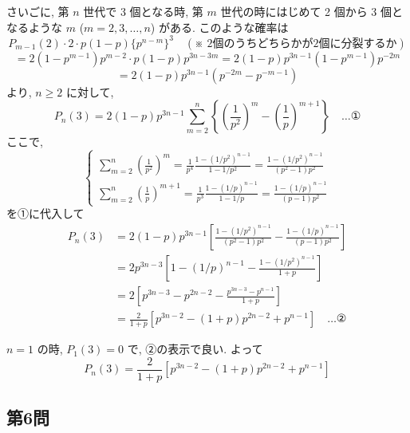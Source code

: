 \documentclass[../main.tex]{subfiles}
\begin{document}
\begin{center}
\end{center}

さいごに, 第 $n$ 世代で 3 個となる時, 第 $m$ 世代の時にはじめて 2 個から 3 個となるような $m$ ($m=2, 3, \dots, n$) がある. このような確率は
\[
  P_{m-1}(2) \cdot 2 \cdot p (1-p) \{ p^{n-m} \}^3 \quad (\text{※ 2個のうちどちらかが2個に分裂するか})
\]
\[
  = 2(1-p^{m-1}) p^{m-2} \cdot p(1-p) p^{3n-3m} = 2(1-p) p^{3n-1} (1-p^{m-1}) p^{-2m}
\]
\[
  = 2(1-p) p^{3n-1} (p^{-2m} - p^{-m-1})
\]
より, $n \ge 2$ に対して,
\[
  P_n(3) = 2(1-p) p^{3n-1} \sum_{m=2}^n \left\{ \left(\frac{1}{p^2}\right)^m - \left(\frac{1}{p}\right)^{m+1} \right\} \quad \dots \text{①}
\]
ここで,
\[
  \begin{cases}
    \sum_{m=2}^n \left(\frac{1}{p^2}\right)^m = \frac{1}{p^4} \frac{1-(1/p^2)^{n-1}}{1-1/p^2} = \frac{1-(1/p^2)^{n-1}}{(p^2-1)p^2} \\
    \sum_{m=2}^n \left(\frac{1}{p}\right)^{m+1} = \frac{1}{p^3} \frac{1-(1/p)^{n-1}}{1-1/p} = \frac{1-(1/p)^{n-1}}{(p-1)p^2}
  \end{cases}
\]
を①に代入して
\begin{align*}
  P_n(3) &= 2(1-p) p^{3n-1} \left[ \frac{1-(1/p^2)^{n-1}}{(p^2-1)p^2} - \frac{1-(1/p)^{n-1}}{(p-1)p^2} \right] \\
  &= 2 p^{3n-3} \left[ 1 - (1/p)^{n-1} - \frac{1-(1/p^2)^{n-1}}{1+p} \right] \\
  &= 2 \left[ p^{3n-3} - p^{2n-2} - \frac{p^{3n-3}-p^{n-1}}{1+p} \right] \\
  &= \frac{2}{1+p} \left[ p^{3n-2} - (1+p) p^{2n-2} + p^{n-1} \right] \quad \dots \text{②}
\end{align*}

$n=1$ の時, $P_1(3)=0$ で, ②の表示で良い. よって
\[
  P_n(3) = \frac{2}{1+p} \left[ p^{3n-2} - (1+p) p^{2n-2} + p^{n-1} \right]
\]

\subsection*{第6問}
\end{document}
